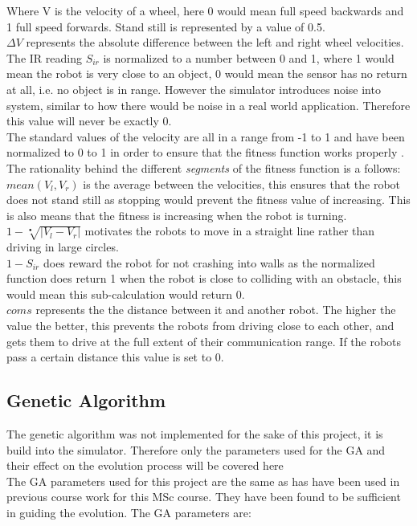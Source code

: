 Where V is the velocity of a wheel, here 0 would mean full speed backwards and 1 full speed forwards. Stand still is represented by a value of 0.5.\\
$\Delta V$ represents the absolute difference between the left and right wheel velocities. \\
The IR reading $S_{ir}$ is normalized to a number between 0 and 1, where 1 would mean the robot is very close to an object, 0 would mean the sensor has no return at all, i.e. no object is in range. However the simulator introduces noise into system, similar to how there would be noise in a real world application. Therefore this value will never be exactly 0. \\
The standard values of the velocity are all in a range from -1 to 1 and have been normalized to 0 to 1 in order to ensure that the fitness function works properly \cite{499791}.  \\
The rationality behind the different \textit{segments} of the fitness function is a follows: 
$mean(V_l, V_r)$ is the average between the velocities, this ensures that the robot does not stand still as stopping would prevent the fitness value of increasing. This is also means that the fitness is increasing when the robot is turning. \\
$1 - \sqrt[•]{|V_l - V_r|}$ motivates the robots to move in a straight line rather than driving in large circles. \\
$1 - S_{ir}$ does reward the robot for not crashing into walls as the normalized function does return 1 when the robot is close to colliding with an obstacle, this would mean this sub-calculation would return 0. \\
$coms$ represents the the distance between it and another robot. The higher the value the better, this prevents the robots from driving close to each other, and gets them to drive at the full extent of their communication range. If the robots pass a certain distance this value is set to 0. 

\subsection{Genetic Algorithm}
The genetic algorithm was not implemented for the sake of this project, it is build into the simulator. Therefore only the parameters used for the GA and their effect on the evolution process will be covered here \\
The GA parameters used for this project are the same as has have been used in previous course work for this MSc course. They have been found to be sufficient in guiding the evolution. The GA parameters are:\\

